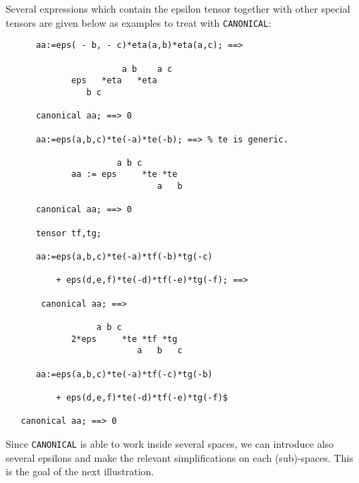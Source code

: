 Several expressions which contain the  epsilon tensor together 
with other special tensors are given below as examples to treat 
with \texttt{CANONICAL}: 
\begin{verbatim}
      aa:=eps( - b, - c)*eta(a,b)*eta(a,c); ==>

                       a b    a c
             eps   *eta   *eta
                b c

      canonical aa; ==> 0

      aa:=eps(a,b,c)*te(-a)*te(-b); ==> % te is generic.

                      a b c
             aa := eps     *te *te
                              a   b

      canonical aa; ==> 0

      tensor tf,tg;

      aa:=eps(a,b,c)*te(-a)*tf(-b)*tg(-c)

          + eps(d,e,f)*te(-d)*tf(-e)*tg(-f); ==>

       canonical aa; ==>

                  a b c
             2*eps     *te *tf *tg
                          a   b   c

      aa:=eps(a,b,c)*te(-a)*tf(-c)*tg(-b)
         
          + eps(d,e,f)*te(-d)*tf(-e)*tg(-f)$

   canonical aa; ==> 0
\end{verbatim}
Since \texttt{CANONICAL} is able to work inside several 
spaces, we can introduce also several epsilons and make the relevant 
simplifications on each (sub)-spaces. This is the goal of the 
next illustration. 
